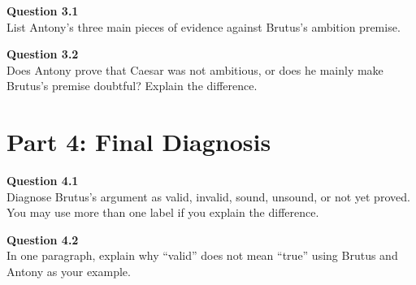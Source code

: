 \documentclass[12pt]{article}
\begin{document}
\textbf{Question 3.1}\\[-0.15em]
List Antony's three main pieces of evidence against Brutus's ambition premise.


\textbf{Question 3.2}\\[-0.15em]
Does Antony prove that Caesar was not ambitious, or does he mainly make Brutus's premise doubtful? Explain the difference.


\newpage

\section*{Part 4: Final Diagnosis}

\textbf{Question 4.1}\\[-0.15em]
Diagnose Brutus's argument as valid, invalid, sound, unsound, or not yet proved. You may use more than one label if you explain the difference.


\textbf{Question 4.2}\\[-0.15em]
In one paragraph, explain why ``valid'' does not mean ``true'' using Brutus and Antony as your example.

\end{document}
